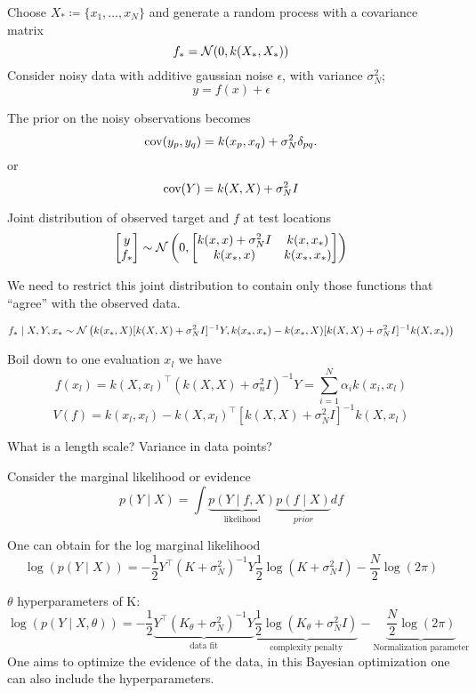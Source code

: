 Choose $X_*\coloneqq\{x_1,\dots,x_N\}$ and generate a random process with a covariance matrix
\[f_*=\mathcal{N}(0,k(X_*,X_*))\]
Consider noisy data with additive gaussian noise $\epsilon$, with variance $\sigma_N^2$;
\[y=f(x)+\epsilon\]

The prior on the noisy observations becomes \[\text{cov}(y_p,y_q)=k(x_p,x_q)+\sigma_N^2\delta_{pq}.\]
or \[\text{cov}(Y)=k(X,X)+\sigma_N^2I\]

Joint distribution of observed target and $f$ at test locations
\begin{align*}
    \begin{bmatrix}
        y\\f_*
    \end{bmatrix}\sim\mathcal{N}\left(0,\begin{bmatrix}
        k(x,x)+\sigma_N^2I & k(x,x_*)\\
        k(x_*,x) & k(x_*,x_*)
    \end{bmatrix}\right)
\end{align*}

We need to restrict this joint distribution to contain only those functions that ``agree''
with the observed data.

\[f_*\mid X,Y,x_*\sim \mathcal{N}\left(k(x_*,X)[k(X,X)+\sigma_N^2I]^{-1}Y,k(x_*,x_*)-k(x_*,X)[k(X,X)+\sigma_N^2I]^{-1}k(X,x_*)\right)\]

Boil down to one evaluation $x_l$ we have
\[f(x_l)=k(X,x_l)^\intercal(k(X,X)+\sigma_n^2I)^{-1}Y=\sum_{i=1}^N \alpha_i k(x_i,x_l)\]
\[V(f)=k(x_l,x_l)-k(X,x_l)^\intercal[k(X,X)+\sigma_N^2I]^{-1}k(X,x_l)\]
\begin{aremark}
    What is a length scale? Variance in data points?
\end{aremark}

Consider the marginal likelihood or evidence 
\[p(Y\mid X)=\int \underbrace{p(Y\mid f,X)}_{\text{likelihood}}\underbrace{p(f\mid X)}_{prior}df\]

One can obtain for the log marginal likelihood 
\[\log(p(Y\mid X))=-\frac{1}{2}Y^\intercal (K+\sigma_N^2)^{-1}Y\frac{1}{2}\log(K+\sigma_N^2I)-\frac{N}{2}\log(2\pi)\]

$\theta$ hyperparameters of K:
\[\log(p(Y\mid X,\theta))=-\frac{1}{2}\underbrace{Y^\intercal (K_\theta+\sigma_N^2)^{-1}Y}_{\text{data fit}}\underbrace{\frac{1}{2}\log(K_\theta+\sigma_N^2I)}_{\text{complexity penalty}}-\underbrace{\frac{N}{2}\log(2\pi)}_{\text{Normalization parameter}}\]
One aims to optimize the evidence of the data, in this Bayesian optimization one can also include the hyperparameters.

